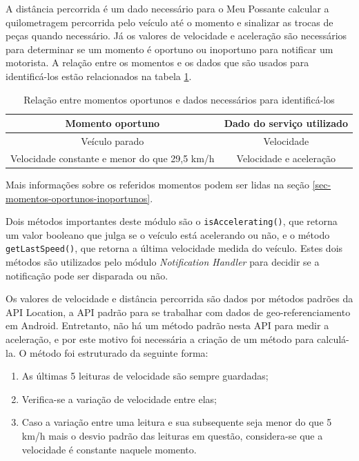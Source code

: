 A distância percorrida é um dado necessário para o Meu Possante calcular a quilometragem percorrida pelo veículo até o momento e
sinalizar as trocas de peças quando necessário. Já os valores de velocidade e aceleração são necessários para determinar se um
momento é oportuno ou inoportuno para notificar um motorista. A relação entre os momentos e os dados que são usados para
identificá-los estão relacionados na tabela \ref{tabela-momentos-dados}.

\begin{table}[h]
\centering
\caption{Relação entre momentos oportunos e dados necessários para identificá-los}
\label{tabela-momentos-dados}
\begin{tabular}{|c|c|}
\hline
\textbf{Momento oportuno}                     & \textbf{Dado do serviço utilizado} \\ \hline
Veículo parado                                & Velocidade                         \\ \hline
Velocidade constante e menor do que 29,5 km/h & Velocidade e aceleração            \\ \hline
\end{tabular}
\end{table}

Mais informações sobre os referidos momentos podem ser lidas na seção \ref{sec-momentos-oportunos-inoportunos}.

Dois métodos importantes deste módulo são o \lstinline[basicstyle=\ttfamily\color{black}]|isAccelerating()|, que retorna um valor
booleano que julga se o veículo está acelerando ou não, e o método \lstinline[basicstyle=\ttfamily\color{black}]|getLastSpeed()|, que
retorna a última velocidade medida do veículo. Estes dois métodos são utilizados pelo módulo \textit{Notification Handler} para decidir se
a notificação pode ser disparada ou não.

Os valores de velocidade e distância percorrida são dados por métodos padrões da API Location, a API padrão para se trabalhar
com dados de geo-referenciamento em Android. Entretanto, não há um método padrão nesta API para medir a aceleração, e por este
motivo foi necessária a criação de um método para calculá-la. O método foi estruturado da seguinte forma:

\begin{enumerate}
  \item As últimas 5 leituras de velocidade são sempre guardadas;
  \item Verifica-se a variação de velocidade entre elas;
  \item Caso a variação entre uma leitura e sua subsequente seja menor do que 5 km/h mais o desvio padrão das leituras em questão,
  considera-se que a velocidade é constante naquele momento.
\end{enumerate}

